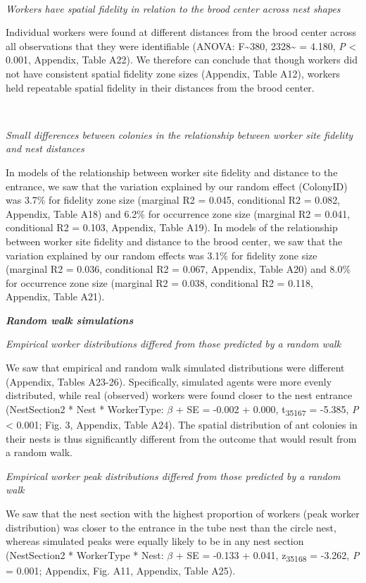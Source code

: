 \documentclass[3p]{elsarticle} %
\begin{document}
~

\emph{Workers have spatial fidelity in relation to the brood center
across nest shapes}

Individual workers were found at different distances from the brood
center across all observations that they were identifiable (ANOVA:
F\textasciitilde380, 2328\textasciitilde{} = 4.180, \emph{P} \textless{}
0.001, Appendix, Table A22). We therefore can conclude that though
workers did not have consistent spatial fidelity zone sizes (Appendix,
Table A12), workers held repeatable spatial fidelity in their distances
from the brood center.

~

\emph{Small differences between colonies in the relationship between
worker site fidelity and nest distances}

In models of the relationship between worker site fidelity and distance
to the entrance, we saw that the variation explained by our random
effect (ColonyID) was 3.7\% for fidelity zone size (marginal R2 = 0.045,
conditional R2 = 0.082, Appendix, Table A18) and 6.2\% for occurrence
zone size (marginal R2 = 0.041, conditional R2 = 0.103, Appendix, Table
A19). In models of the relationship between worker site fidelity and
distance to the brood center, we saw that the variation explained by our
random effects was 3.1\% for fidelity zone size (marginal R2 = 0.036,
conditional R2 = 0.067, Appendix, Table A20) and 8.0\% for occurrence
zone size (marginal R2 = 0.038, conditional R2 = 0.118, Appendix, Table
A21).

\textbf{\emph{Random walk simulations}}

\emph{Empirical worker distributions differed from those predicted by a
random walk}

We saw that empirical and random walk simulated distributions were
different (Appendix, Tables A23-26). Specifically, simulated agents were
more evenly distributed, while real (observed) workers were found closer
to the nest entrance (NestSection2 * Nest * WorkerType: \(\beta\) + SE =
-0.002 + 0.000, t\textsubscript{35167} = -5.385, \emph{P} \textless{}
0.001; Fig. 3, Appendix, Table A24). The spatial distribution of ant
colonies in their nests is thus significantly different from the outcome
that would result from a random walk.

\emph{Empirical worker peak distributions differed from those predicted
by a random walk}

We saw that the nest section with the highest proportion of workers
(peak worker distribution) was closer to the entrance in the tube nest
than the circle nest, whereas simulated peaks were equally likely to be
in any nest section (NestSection2 * WorkerType * Nest: \(\beta\) + SE =
-0.133 + 0.041, z\textsubscript{35168} = -3.262, \emph{P} = 0.001;
Appendix, Fig. A11, Appendix, Table A25).
\end{document}
